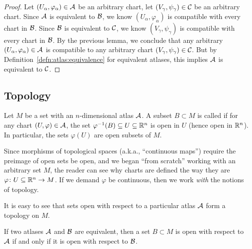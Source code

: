 \begin{proof}
Let $(U_{\alpha},\varphi_{\alpha})\in\mathcal{A}$ be an arbitrary chart,
let $(V_{\gamma},\psi_{\gamma})\in\mathcal{C}$ be an arbitrary chart. 
Since $\mathcal{A}$ is equivalent to $\mathcal{B}$, we know
$(U_{\alpha},\varphi_{\alpha})$ is compatible with every chart in $\mathcal{B}$.
Since $\mathcal{B}$ is equivalent to $\mathcal{C}$, we know
$(V_{\gamma},\psi_{\gamma})$ is compatible with every chart in $\mathcal{B}$.
By the previous lemma, we conclude that any arbitrary
$(U_{\alpha},\varphi_{\alpha})\in\mathcal{A}$ is compatible to any arbitrary
chart $(V_{\gamma},\psi_{\gamma})\in\mathcal{C}$. But by Definition~\ref{defn:atlas:equivalence} for
equivalent atlases, this implies $\mathcal{A}$ is equivalent to $\mathcal{C}$.
\end{proof}

\subsection{Topology}

\begin{definition}
Let $M$ be a set with an $n$-dimensional atlas $\mathcal{A}$. A subset
$B\subset M$
is called  if for any chart
$(U,\varphi)\in\mathcal{A}$, the set $\varphi^{-1}(B)\subseteq U\subseteq\mathbb{R}^{n}$
is open in $U$ (hence open in $\mathbb{R}^{n}$).
In particular, the sets $\varphi(U)$ are open subsets of $M$.
\end{definition}

\begin{remark}
Since morphisms of topological spaces (a.k.a., ``continuous maps'')
require the preimage of open sets be open, and we began ``from scratch''
working with an arbitrary set $M$, the reader can see why charts are
defined the way they are $\varphi\colon U\subseteq\mathbb{R}^{n}\to M$. If we
demand $\varphi$ be continuous, then we work \emph{with} the notions of
topology. 
\end{remark}

\begin{remark}
It is easy to see that sets open with respect to a particular atlas
$\mathcal{A}$ form a topology on $M$.
\end{remark}

\begin{proposition}
If two atlases $\mathcal{A}$ and $\mathcal{B}$ are equivalent, then a set
$B\subset M$ is open with respect to $\mathcal{A}$ if and only if it is
open with respect to $\mathcal{B}$.
\end{proposition}

